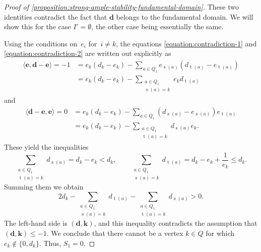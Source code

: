 \documentclass[JEP,XML,SOM,Unicode,NoEqCountersInSection,published]{cedram}
\theoremstyle{plain}
\theoremstyle{definition}
\DeclareMathOperator\source{s}
\DeclareMathOperator\target{t}
\newcommand\tuple[1]{\ensuremath{{\boldsymbol{#1}}}}
\begin{document}
\begin{proof}[Proof of \cref{proposition:strong-ample-stability-fundamental-domain}]
These two identities contradict the fact that $\tuple{d}$ belongs to the fundamental domain.
We will show this for the case $I' = \emptyset$, the other case being essentially the same.

Using the conditions on~$e_i$ for~$i\neq k$,
the equations \eqref{equation:contradiction-1} and \eqref{equation:contradiction-2} are written out explicitly as\vspace*{-3pt}
\begin{equation*}
\begin{aligned}
\langle \tuple{e}, \tuple{d} - \tuple{e} \rangle = -1
&= e_k(d_k - e_k) - \sum_{a \in Q_1}e_{\source(a)}(d_{\target(a)} - e_{\target(a)}) \\
&= e_k(d_k - e_k) - \sum_{\substack{a\in Q_1 \\ \source(a)=k}} e_{k} d_{\target(a)}
\end{aligned}
\end{equation*}
and\vspace*{-3pt}
\begin{equation*}
\begin{aligned}
\langle \tuple{d} - \tuple{e}, \tuple{e} \rangle = 0
&= e_k(d_k - e_k) - \sum_{a \in Q_1}(d_{\source(a)} - e_{\source(a)})e_{\target(a)} \\
&= e_k(d_k - e_k) - \sum_{\substack{a\in Q_1 \\ \target(a)=k}} d_{\source(a)} e_{k}.
\end{aligned}
\end{equation*}
These yield the inequalities\vspace*{-3pt}
\begin{equation*}
\sum_{\substack{a\in Q_1 \\ \target(a)=k}} d_{\source(a)} = d_k - e_k < d_k, \qquad
\sum_{\substack{a\in Q_1 \\ \source(a)=k}} d_{\target(a)} = d_k - e_k + \frac{1}{e_k} \leq d_k.
\end{equation*}
Summing them we obtain\vspace*{-3pt}
\begin{equation*}
2d_k - \sum_{\substack{a\in Q_1 \\ \source(a)=k}} d_{\target(a)} - \sum_{\substack{a\in Q_1\\\target(a)=k}} d_{\source(a)} > 0.
\end{equation*}
The left-hand side is $(\tuple{d},\tuple{k})$, and
this inequality contradicts the assumption that $(\tuple{d},\tuple{k}) \leq -1$.
We conclude that there cannot be a vertex $k \in Q$ for which $e_k \notin \{0,d_k\}$.
Thus, $S_1 = 0$.


\end{proof}
\end{document}
